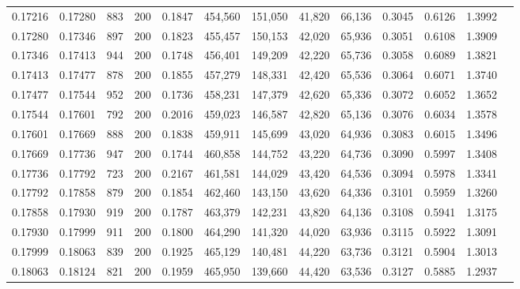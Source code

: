 \begin{tabular}{rrrrrrrrrrrrr}
0.17216 & 0.17280 &    883 & 200 &                                     0.1847 & 454,560 & 151,050 &  41,820 &  66,136 & 0.3045 & 0.6126 & 1.3992 \\
0.17280 & 0.17346 &    897 & 200 &                                     0.1823 & 455,457 & 150,153 &  42,020 &  65,936 & 0.3051 & 0.6108 & 1.3909 \\
0.17346 & 0.17413 &    944 & 200 &                                     0.1748 & 456,401 & 149,209 &  42,220 &  65,736 & 0.3058 & 0.6089 & 1.3821 \\
0.17413 & 0.17477 &    878 & 200 &                                     0.1855 & 457,279 & 148,331 &  42,420 &  65,536 & 0.3064 & 0.6071 & 1.3740 \\
0.17477 & 0.17544 &    952 & 200 &                                     0.1736 & 458,231 & 147,379 &  42,620 &  65,336 & 0.3072 & 0.6052 & 1.3652 \\
0.17544 & 0.17601 &    792 & 200 &                                     0.2016 & 459,023 & 146,587 &  42,820 &  65,136 & 0.3076 & 0.6034 & 1.3578 \\
0.17601 & 0.17669 &    888 & 200 &                                     0.1838 & 459,911 & 145,699 &  43,020 &  64,936 & 0.3083 & 0.6015 & 1.3496 \\
0.17669 & 0.17736 &    947 & 200 &                                     0.1744 & 460,858 & 144,752 &  43,220 &  64,736 & 0.3090 & 0.5997 & 1.3408 \\
0.17736 & 0.17792 &    723 & 200 &                                     0.2167 & 461,581 & 144,029 &  43,420 &  64,536 & 0.3094 & 0.5978 & 1.3341 \\
0.17792 & 0.17858 &    879 & 200 &                                     0.1854 & 462,460 & 143,150 &  43,620 &  64,336 & 0.3101 & 0.5959 & 1.3260 \\
0.17858 & 0.17930 &    919 & 200 &                                     0.1787 & 463,379 & 142,231 &  43,820 &  64,136 & 0.3108 & 0.5941 & 1.3175 \\
0.17930 & 0.17999 &    911 & 200 &                                     0.1800 & 464,290 & 141,320 &  44,020 &  63,936 & 0.3115 & 0.5922 & 1.3091 \\
0.17999 & 0.18063 &    839 & 200 &                                     0.1925 & 465,129 & 140,481 &  44,220 &  63,736 & 0.3121 & 0.5904 & 1.3013 \\
0.18063 & 0.18124 &    821 & 200 &                                     0.1959 & 465,950 & 139,660 &  44,420 &  63,536 & 0.3127 & 0.5885 & 1.2937 \\

\end{tabular}
